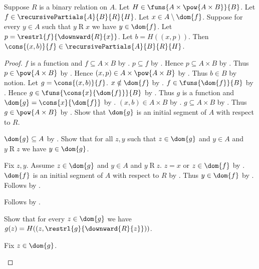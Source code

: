 \begin{proposition}\label{extend_recursive_partial}
    Suppose $R$ is a binary relation on $A$.
    Let $H\in\funs{A\times\pow{A\times B}}{B}$.
    Let $f\in\recursivePartials{A}{B}{R}{H}$.
    Let $x\in A\setminus\dom{f}$.
    Suppose for every $y\in A$ such that $y\mathrel{R}x$ we have $y\in\dom{f}$.
    Let $p=\restrl{f}{\downward{R}{x}}$.
    Let $b=H((x,p))$.
    Then $\cons{(x,b)}{f}\in\recursivePartials{A}{B}{R}{H}$.
\end{proposition}
\begin{proof}
    $f$ is a function and $f\subseteq A\times B$
        by .
    $p\subseteq f$ by .
    Hence $p\subseteq A\times B$ by .
    Thus $p\in\pow{A\times B}$ by .
    Hence $(x,p)\in A\times\pow{A\times B}$ by .
    Thus $b\in B$ by notion.
    Let $g=\cons{(x,b)}{f}$.
    $x\notin\dom{f}$ by .
    $f\in\funs{\dom{f}}{B}$ by .
    Hence $g\in\funs{\cons{x}{\dom{f}}}{B}$
        by .
    Thus $g$ is a function and $\dom{g}=\cons{x}{\dom{f}}$
        by .
    $(x,b)\in A\times B$ by .
    $g\subseteq A\times B$ by .
    Thus $g\in\pow{A\times B}$ by .
    Show that $\dom{g}$ is an initial segment of $A$ with respect to $R$.
    \begin{subproof}
        $\dom{g}\subseteq A$
            by .
        Show that for all $z,y$ such that $z\in\dom{g}$ and $y\in A$
            and $y\mathrel{R}z$ we have $y\in\dom{g}$.
        \begin{subproof}
            Fix $z,y$.
            Assume $z\in\dom{g}$ and $y\in A$ and $y\mathrel{R}z$.
            $z=x$ or $z\in\dom{f}$ by .
            $\dom{f}$ is an initial segment of $A$ with respect to $R$
                by .
            Thus $y\in\dom{f}$ by .
            Follows by .
        \end{subproof}
        Follows by .
    \end{subproof}
    Show that for every $z\in\dom{g}$ we have
        $g(z)=H((z,\restrl{g}{\downward{R}{z}}))$.
    \begin{subproof}
        Fix $z\in\dom{g}$.

\end{subproof}
\end{proof}
